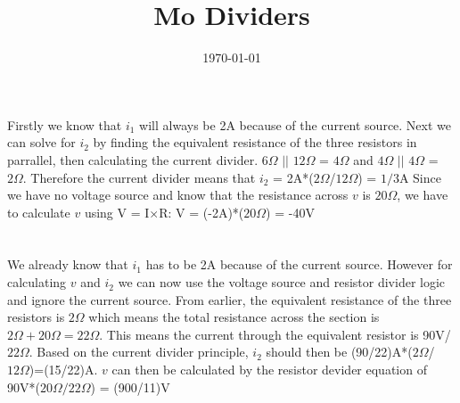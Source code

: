 \documentclass{article}
\begin{document}
\title{Mo Dividers}
\author{}
\date{\today}

\maketitle

\section{}

Firstly we know that $i_1$ will always be 2A because of the current source.
\newline
Next we can solve for $i_2$ by finding the equivalent resistance of the three resistors
in parrallel, then calculating the current divider. $6\Omega$ $||$ $12\Omega$ =
$4\Omega$ and $4\Omega$ $||$ $4\Omega$ = $2\Omega$. Therefore the current divider means
that $i_2$ = 2A*($2\Omega$/$12\Omega$) = $1/3$A
\newline
\newline
Since we have no voltage source and know that the resistance across $v$ is $20\Omega$,
we have to calculate $v$ using V = I$\times$R: V = (-2A)*($20\Omega$) = -40V

\section{}

We already know that $i_1$ has to be 2A because of the current source. However
for calculating $v$ and $i_2$ we can now use the voltage source and resistor divider
logic and ignore the current source. From earlier, the equivalent resistance of the three
resistors is $2\Omega$ which means the total resistance across the section is
$2\Omega + 20\Omega = 22\Omega$. This means the current through the equivalent resistor
is 90V/$22\Omega$. Based on the current divider principle, $i_2$ should then be
(90/22)A*($2\Omega$/$12\Omega$)=(15/22)A.
\newline
$v$ can then be calculated by the resistor
devider equation of 90V*($20\Omega/22\Omega$) = (900/11)V
\end{document}

